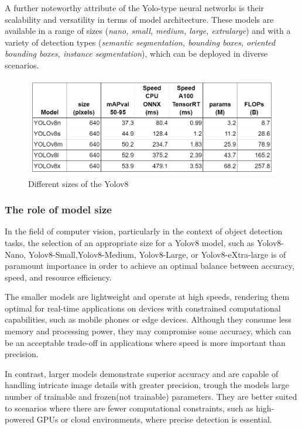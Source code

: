 A further noteworthy attribute of the Yolo-type neural networks is their scalability and versatility in terms of model architecture.
These models are available in a range of sizes (\textit{nano, small, medium, large, extralarge}) and with a variety of detection types (\textit{semantic segmentation, bounding boxes,
oriented bounding boxes, instance segmentation}), which can be deployed in diverse scenarios.




\begin{figure}[ht]
\includegraphics[width=1.0\textwidth]{figures/table1}
\caption{Different sizes of the Yolov8~\cite{githubGitHubUltralyticsultralytics}}
\label{fig:tableofsizes}
\end{figure}

\subsubsection{The role of model size}\label{subsubsec:model-size}
In the field of computer vision, particularly in the context of object detection tasks, the selection of an appropriate size for a
Yolov8 model, such as Yolov8-Nano, Yolov8-Small,Yolov8-Medium,  Yolov8-Large, or Yolov8-eXtra-large is of paramount importance in order to achieve an optimal balance between accuracy, speed, and resource efficiency.

The smaller models are lightweight and operate at high speeds, rendering them optimal for real-time applications on devices with constrained computational capabilities, such as mobile phones or edge devices.
Although they consume less memory and processing power, they may compromise some accuracy, which can be an acceptable trade-off in applications where speed is more important than precision.

In contrast, larger models demonstrate superior accuracy and are capable of handling intricate image details with greater precision, trough the models large number of trainable and frozen(not trainable) parameters.
They are better suited to scenarios where there are fewer computational constraints, such as high-powered GPUs or cloud environments, where precise detection is essential.

